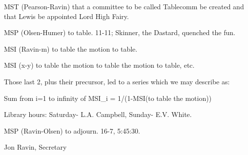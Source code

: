 \documentclass[12pt]{article}
\begin{document}
MST (Pearson-Ravin) that a committee to be called Tablecomm be created and that Lewis be appointed Lord High Fairy.

MSP (Olsen-Humer) to table. 11-11; Skinner, the Dastard, quenched the fun.

MSI (Ravin-m) to table the motion to table.

MSI (x-y) to table the motion to table the motion to table, etc.

Those last 2, plus their precursor, led to a series which we may describe as:

Sum from i=1 to infinity of MSI_i = 1/(1-MSI(to table the motion))

Library hours: Saturday- L.A. Campbell, Sunday- E.V. White.

MSP (Ravin-Olsen) to adjourn. 16-7, 5:45:30.

\vspace{12pt}

\centerline{Jon Ravin, Secretary}
\end{document}
